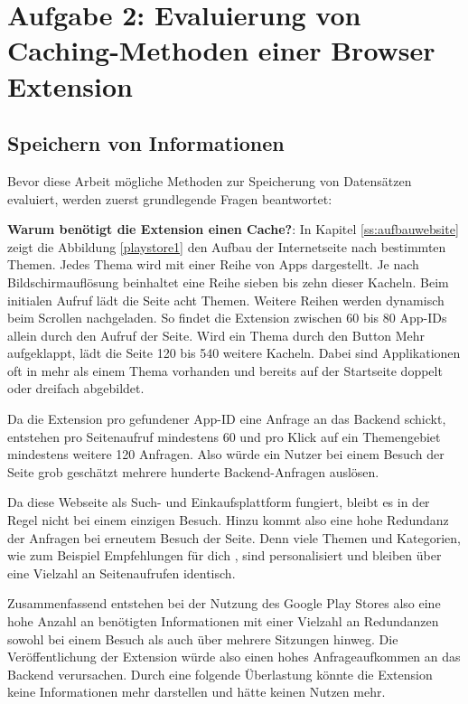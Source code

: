 \section{Aufgabe 2: Evaluierung von Caching-Methoden einer Browser Extension}
\label{s:evaluierungcaching}


\subsection{Speichern von Informationen}
\label{ss:speichern}

Bevor diese Arbeit mögliche Methoden zur Speicherung von Datensätzen evaluiert, werden zuerst grundlegende Fragen beantwortet:

\textbf{Warum benötigt die Extension einen Cache?}:
In Kapitel \ref{ss:aufbauwebsite} zeigt die Abbildung \ref{playstore1} den Aufbau der Internetseite nach bestimmten Themen. Jedes Thema wird mit einer Reihe von Apps dargestellt. Je nach Bildschirmauflösung beinhaltet eine Reihe sieben bis zehn dieser Kacheln.
Beim initialen Aufruf lädt die Seite acht Themen. Weitere Reihen werden dynamisch beim Scrollen nachgeladen. So findet die Extension zwischen 60 bis 80 App-IDs allein durch den Aufruf der Seite. Wird ein Thema durch den Button \glqq Mehr\grqq{} aufgeklappt, lädt die Seite 120 bis 540 weitere Kacheln. Dabei sind Applikationen oft in mehr als einem Thema vorhanden und bereits auf der Startseite doppelt oder dreifach abgebildet.

Da die Extension pro gefundener App-ID eine Anfrage an das Backend schickt, entstehen pro Seitenaufruf mindestens 60 und pro Klick auf ein Themengebiet mindestens weitere 120 Anfragen. Also würde ein Nutzer bei einem Besuch der Seite grob geschätzt mehrere hunderte Backend-Anfragen auslösen.

Da diese Webseite als Such- und Einkaufsplattform fungiert, bleibt es in der Regel nicht bei einem einzigen Besuch. Hinzu kommt also eine hohe Redundanz der Anfragen bei erneutem Besuch der Seite. Denn viele Themen und Kategorien, wie zum Beispiel \glqq Empfehlungen für dich \grqq{}, sind personalisiert und bleiben über eine Vielzahl an Seitenaufrufen identisch.

Zusammenfassend entstehen bei der Nutzung des Google Play Stores also eine hohe Anzahl an benötigten Informationen mit einer Vielzahl an Redundanzen sowohl bei einem Besuch als auch über mehrere Sitzungen hinweg. Die Veröffentlichung der Extension würde also einen hohes Anfrageaufkommen an das Backend verursachen. Durch eine folgende Überlastung könnte die Extension keine Informationen mehr darstellen und hätte keinen Nutzen mehr.

